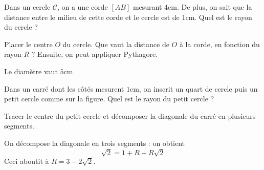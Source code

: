 \begin{exo}
Dans un cercle $\mathcal C$, on a une corde $[AB]$ mesurant $4$cm. 
De plus, on sait que la distance entre le milieu de cette corde et le cercle est de $1$cm.
Quel est le rayon du cercle ?
\begin{center}
\end{center}
\begin{hint}
Placer le centre $O$ du cercle. Que vaut la distance de $O$ à la corde, en fonction du rayon $R$ ?
Ensuite, on peut appliquer Pythagore.
\end{hint}
\begin{sol}
Le diamètre vaut $5$cm.
\end{sol}
\end{exo}




\begin{exo}
Dans un carré dont les côtés mesurent $1$cm, on inscrit un quart de cercle puis un petit cercle comme sur la figure.
Quel est le rayon du petit cercle ?
\begin{center}
\end{center}
\begin{hint}
Tracer le centre du petit cercle et décomposer la diagonale du carré en plusieurs segments.
\end{hint}
\begin{sol}
On décompose la diagonale en trois segments : on obtient
\[ \sqrt 2 = 1+R+R\sqrt 2\]
Ceci aboutit à $R=3-2\sqrt{2}$.
\end{sol}
\end{exo}


